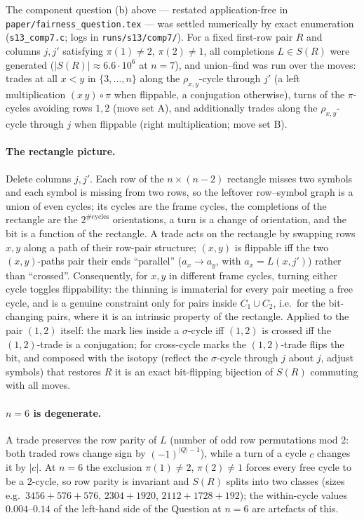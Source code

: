 The component question (b) above --- restated application-free in
\texttt{paper/fairness\_question.tex} --- was settled numerically by
exact enumeration (\texttt{s13\_comp7.c}; logs in
\texttt{runs/s13/comp7/}).  For a fixed first-row pair $R$ and columns
$j,j'$ satisfying $\pi(1)\ne2$, $\pi(2)\ne1$, all completions $L\in
S(R)$ were generated ($|S(R)|\approx6.6\cdot10^6$ at $n=7$), and
union--find was run over the moves: trades at all $x<y$ in
$\{3,\dots,n\}$ along the $\rho_{x,y}$-cycle through $j'$ (a left
multiplication $(x\,y)\circ\pi$ when flippable, a conjugation
otherwise), turns of the $\pi$-cycles avoiding rows $1,2$ (move set A),
and additionally trades along the $\rho_{x,y}$-cycle through $j$ when
flippable (right multiplication; move set B).

\paragraph{The rectangle picture.}  Delete columns $j,j'$.  Each row
of the $n\times(n-2)$ rectangle misses two symbols and each symbol is
missing from two rows, so the leftover row--symbol graph is a union of
even cycles; its cycles are the frame cycles, the completions of the
rectangle are the $2^{\#\text{cycles}}$ orientations, a turn is a
change of orientation, and the bit is a function of the rectangle.  A
trade acts on the rectangle by swapping rows $x,y$ along a path of
their row-pair structure; $(x,y)$ is flippable iff the two
$(x,y)$-paths pair their ends ``parallel'' ($a_x\to a_y$, with
$a_x=L(x,j')$) rather than ``crossed''.  Consequently, for $x,y$ in
different frame cycles, turning either cycle toggles flippability: the
thinning is immaterial for every pair meeting a free cycle, and is a
genuine constraint only for pairs inside $C_1\cup C_2$, i.e.\ for the
bit-changing pairs, where it is an intrinsic property of the
rectangle.  Applied to the pair $(1,2)$ itself: the mark lies inside a
$\sigma$-cycle iff $(1,2)$ is crossed iff the $(1,2)$-trade is a
conjugation; for cross-cycle marks the $(1,2)$-trade flips the bit,
and composed with the isotopy (reflect the $\sigma$-cycle through $j$
about $j$, adjust symbols) that restores $R$ it is an exact
bit-flipping bijection of $S(R)$ commuting with all moves.

\paragraph{$n=6$ is degenerate.}  A trade preserves the row parity
of $L$ (number of odd row permutations mod 2: both traded rows change
sign by $(-1)^{|Q|-1}$), while a turn of a cycle $c$ changes it by
$|c|$.  At $n=6$ the exclusion $\pi(1)\ne2$, $\pi(2)\ne1$ forces
every free cycle to be a $2$-cycle, so row parity is invariant and
$S(R)$ splits into two classes (sizes e.g.\ $3456+576+576$, $2304+1920$,
$2112+1728+192$); the within-cycle values $0.004$--$0.14$ of the
left-hand side of the Question at $n=6$ are artefacts of this.

